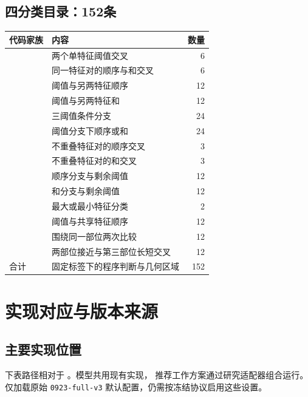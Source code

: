 \documentclass[11pt,a4paper]{article}
\numberwithin{equation}{section}
\begin{document}
\subsection{四分类目录：152条}
{\small
\begin{longtable}{L{5.5cm}L{8.2cm}r}
\toprule
代码家族 & 内容 & 数量\\
\midrule\endhead
{} & 两个单特征阈值交叉 & 6\\
 & 同一特征对的顺序与和交叉 & 6\\
 & 阈值与另两特征顺序 & 12\\
 & 阈值与另两特征和 & 12\\
 & 三阈值条件分支 & 24\\
 & 阈值分支下顺序或和 & 24\\
 & 不重叠特征对的顺序交叉 & 3\\
 & 不重叠特征对的和交叉 & 3\\
 & 顺序分支与剩余阈值 & 12\\
 & 和分支与剩余阈值 & 12\\
 & 最大或最小特征分类 & 2\\
 & 阈值与共享特征顺序 & 12\\
 & 围绕同一部位两次比较 & 12\\
 & 两部位接近与第三部位长短交叉 & 12\\
\midrule
合计 & 固定标签下的程序判断与几何区域 & 152\\
\bottomrule
\end{longtable}}

\clearpage
\section{实现对应与版本来源}
\label{app:provenance}

\subsection{主要实现位置}
下表路径相对于 。模型共用现有实现，
推荐工作方案通过研究适配器组合运行。仅加载原始 \texttt{0923-full-v3} 默认配置，仍需按冻结协议启用这些设置。
\end{document}
